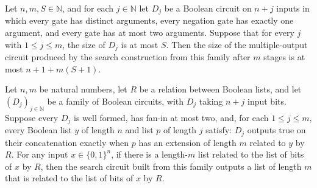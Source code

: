 \begin{theorem}
\label{BoolCircuit.searchCircuit_size_le}
\leanok
{}
Let $n,m,S\in\mathbb{N}$, and for each $j\in\mathbb{N}$ let $D_j$ be a Boolean circuit
on $n+j$ inputs in which every gate has distinct arguments, every negation gate has
exactly one argument, and every gate has at most two arguments. Suppose that for every
$j$ with $1\le j\le m$, the size of $D_j$ is at most $S$. Then the size of the
multiple-output circuit produced by the search construction from this family after $m$
stages is at most $n+1+m(S+1)$.
\end{theorem}

\begin{theorem}
\label{BoolCircuit.searchCircuit_correct}
\leanok
{}
Let $n,m$ be natural numbers, let $R$ be a relation between Boolean lists, and let
$(D_j)_{j\in\mathbb N}$ be a family of Boolean circuits, with $D_j$ taking $n+j$ input
bits. Suppose every $D_j$ is well formed, has fan-in at most two, and, for each $1\le
j\le m$, every Boolean list $y$ of length $n$ and list $p$ of length $j$ satisfy: $D_j$
outputs true on their concatenation exactly when $p$ has an extension of length $m$
related to $y$ by $R$. For any input $x\in\{0,1\}^n$, if there is a length-$m$ list
related to the list of bits of $x$ by $R$, then the search circuit built from this
family outputs a list of length $m$ that is related to the list of bits of $x$ by $R$.
\end{theorem}
